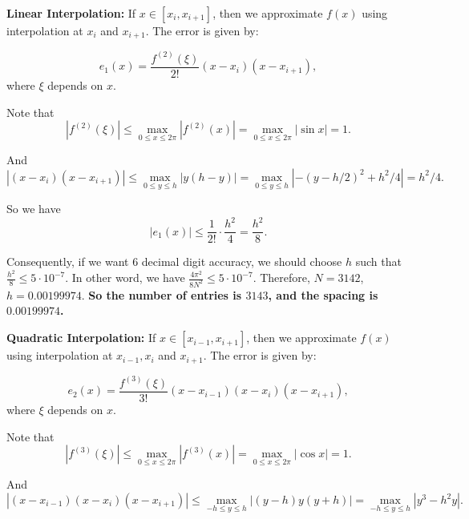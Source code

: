 \documentclass[
  course = {{16-811 Math Fundamentals for Robotics}},
  quartile = {{1}},
  assignment = 2,
  name = {{Kangle Deng}},
  email = {{kangled@andrew.cmu.edu}},
  firstexercise = 1
]{aga-homework}
\begin{document}
\subexercise \textbf{Linear Interpolation:} If $x \in [x_i, x_{i+1}]$, then we approximate $f(x)$ using interpolation at $x_i$ and $x_{i+1}$. The error is given by:

\begin{equation*}
    e_1(x) = \frac{f^{(2)}(\xi)}{2!}(x-x_i)(x-x_{i+1}),
\end{equation*}
where $\xi$ depends on $x$.

Note that
\begin{equation*}
    | f^{(2)}(\xi) | \le \max \limits_{0 \le x \le 2\pi} |f^{(2)}(x)| = \max \limits_{0 \le x \le 2\pi} |\sin x| = 1.
\end{equation*}

And
\begin{equation*}
    | (x-x_i)(x-x_{i+1}) | \le \max \limits_{0 \le y \le h} |y (h - y)| = \max \limits_{0 \le y \le h} | -(y - h/2)^2 + h^2/4 | = h^2 / 4.
\end{equation*}

So we have
\begin{equation*}
    |e_1(x)| \le \frac{1}{2!} \cdot \frac{h^2}{4} = \frac{h^2}{8}.
\end{equation*}

Consequently, if we want 6 decimal digit accuracy, we should choose $h$ such that $\frac{h^2}{8} \le 5 \cdot 10^{-7}$. In other word, we have $\frac{4\pi^2}{8N^2} \le 5 \cdot 10^{-7}$. Therefore, $N = 3142$, $h = 0.00199974$. \textbf{So the number of entries is $3143$, and the spacing is $0.00199974$.}

\subexercise \textbf{Quadratic Interpolation:} If $x \in [x_{i-1}, x_{i+1}]$, then we approximate $f(x)$ using interpolation at $x_{i-1}, x_i$ and $x_{i+1}$. The error is given by:

\begin{equation*}
    e_2(x) = \frac{f^{(3)}(\xi)}{3!}(x-x_{i-1})(x-x_i)(x-x_{i+1}),
\end{equation*}
where $\xi$ depends on $x$.

Note that
\begin{equation*}
    | f^{(3)}(\xi) | \le \max \limits_{0 \le x \le 2\pi} |f^{(3)}(x)| = \max \limits_{0 \le x \le 2\pi} |\cos x| = 1.
\end{equation*}

And
\begin{equation*}
    | (x-x_{i-1})(x-x_i)(x-x_{i+1}) | \le \max \limits_{-h \le y \le h} |(y - h) y (y + h)| = \max \limits_{-h \le y \le h} | y^3 - h^2y |.
\end{equation*}
\end{document}
